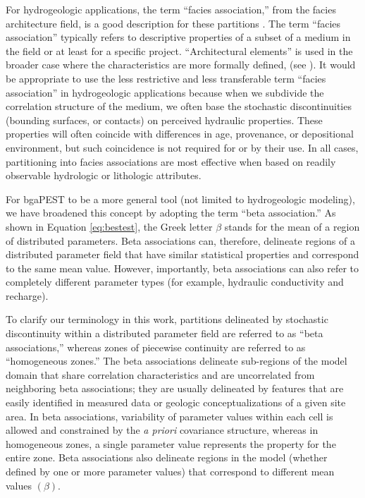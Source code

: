\documentclass[11pt,oneside,onecolumn]{usgsreport}
\begin{document}
\begin{multicols}{2}
\begin{bibunit}
For hydrogeologic applications, the term ``facies association,''
from the facies architecture field, is a good description for these
partitions \citep{fienenIsthmusWRR}. The term ``facies association''
typically refers to descriptive properties of a subset of a medium
in the field or at least for a specific project. ``Architectural
elements'' is used in the broader case where the characteristics
are more formally defined, (see \citet{Collinson1969,Walker1984,Walker1992,SwiftEtAl2003}).
It would be appropriate to use the less restrictive and less transferable
term ``facies association'' in hydrogeologic applications because
when we subdivide the correlation structure of the medium, we often
base the stochastic discontinuities (bounding surfaces, or contacts)
on perceived hydraulic properties. These properties will often coincide
with differences in age, provenance, or depositional environment,
but such coincidence is not required for or by their use. In all cases,
partitioning into facies associations are most effective when based
on readily observable hydrologic or lithologic attributes.

For bgaPEST to be a more general tool (not limited to hydrogeologic
modeling), we have broadened this concept by adopting the term ``beta
association.'' As shown in Equation \ref{eq:bestest}, the Greek
letter $\beta$ stands for the mean of a region of distributed parameters.
Beta associations can, therefore, delineate regions of a distributed
parameter field that have similar statistical properties and correspond
to the same mean value. However, importantly, beta associations can
also refer to completely different parameter types (for example, hydraulic
conductivity and recharge). 

To clarify our terminology in this work, partitions delineated by
stochastic discontinuity within a distributed parameter field are
referred to as ``beta associations,'' whereas zones of piecewise
continuity are referred to as ``homogeneous zones.'' The beta associations
delineate sub-regions of the model domain that share correlation characteristics
and are uncorrelated from neighboring beta associations; they are
usually delineated by features that are easily identified in measured
data or geologic conceptualizations of a given site area. In beta
associations, variability of parameter values within each cell is
allowed and constrained by the \emph{a priori} covariance structure,
whereas in homogeneous zones, a single parameter value represents
the property for the entire zone. Beta associations also delineate
regions in the model (whether defined by one or more parameter values)
that correspond to different mean values $\left(\beta\right)$.


\end{bibunit}
\end{multicols}
\end{document}
